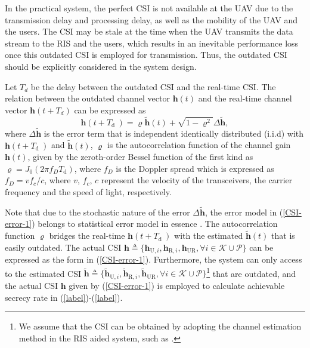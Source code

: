 \documentclass[journal]{IEEEtran}
\begin{document}
\newpage
In the practical system, the perfect CSI is not available at the UAV due to the transmission delay and processing delay, as well as the mobility of the UAV and the users. The CSI may be stale at the time when the UAV transmits the data stream to the RIS and the users, which results in an inevitable performance loss once this outdated CSI is employed for transmission. Thus, the outdated CSI should be explicitly considered in the system design.



Let $T_d$ be the delay between the outdated CSI and the real-time CSI. The relation between the outdated channel vector $\bm{h}(t)$ and the real-time channel vector $\bm{h}(t+T_d)$ can be expressed as~\cite{CSI-error-2}
\begin{equation}\label{CSI-error-1}
  \bm{h}\left(t+T_{\text {d }}\right)=\varrho  \tilde{\bm{h}}(t)+\sqrt{1-\varrho^{2}} \Delta \tilde{\bm{h}},
\end{equation}
where $\Delta \tilde{\bm{h}}$ is the error term that is independent identically distributed (i.i.d) with $\bm{h}\left(t+T_{\text {d }}\right)$ and $\tilde{\bm{h}}(t)$, $\varrho $ is the autocorrelation function of the channel gain $\bm{h}(t)$, given by the zeroth-order Bessel function of the first kind as
  $ \varrho=J_{0}\left(2 \pi f_{D} T_{\mathrm{d}}\right) $,
where $f_D$ is the Doppler spread which is expressed as $f_{D}=v f_{c} / c$, where $v$, $f_c$, $c$ represent the velocity of the transceivers, the carrier frequency and the speed of light, respectively. 

Note that due to the stochastic nature of the error $\Delta \tilde{\bm{h}}$, the error model in (\ref{CSI-error-1}) belongs to statistical error model in essence \cite{CSI-error-1,CSI-error-2}. The autocorrelation function $ \varrho $ bridges the real-time $ \bm{h}\left(t+T_{\text {d }}\right) $ with the estimated $\tilde{\bm{h}}(t)$ that is easily outdated. The actual CSI $ \bm{h} \triangleq \{ \bm{h}_{\mathrm{U}, i},\bm{h}_{\mathrm{R}, i},\bm{h}_{\mathrm{UR}}, \forall i \in \mathcal{K} \cup \mathcal{P}\} $ can be expressed as the form in (\ref{CSI-error-1}). Furthermore, the system can only access to the estimated CSI $ {\tilde{\bm{h}}} \triangleq \{ \tilde{\bm{h}}_{\mathrm{U}, i},\tilde{\bm{h}}_{\mathrm{R}, i},\tilde{\bm{h}}_{\mathrm{UR}}, \forall i \in \mathcal{K} \cup \mathcal{P} \} $\footnote{We assume that the CSI can be obtained by adopting the channel estimation method in the RIS aided system, such as \cite{bibid}.  } that are outdated, and the actual CSI $ \bm{h} $ given by (\ref{CSI-error-1}) is employed to calculate achievable secrecy rate in (\ref{label})-(\ref{label}).
\end{document}
